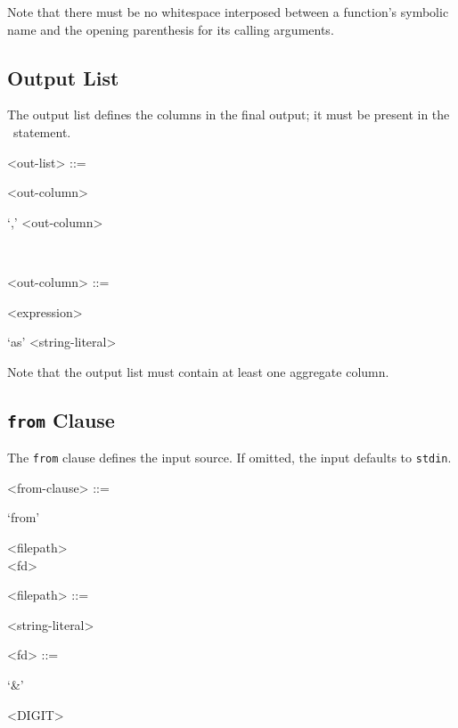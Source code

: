 Note that there must be no whitespace interposed between a function's
symbolic name and the opening parenthesis for its calling arguments.

\subsection{Output List}

The output list defines the columns in the final output; it must be
present in the \stag\ statement.

\begin{grammar}
  <out-list> ::= \begin{syntdiag}
    <out-column>
    \begin{stack}
      \begin{rep}`,' <out-column>\end{rep} \\
    \end{stack}
  \end{syntdiag}

  <out-column> ::= \begin{syntdiag}
    <expression>
    \begin{stack}
      `as' <string-literal> \\
    \end{stack}
  \end{syntdiag}
\end{grammar}

Note that the output list must contain at least one aggregate column.

\subsection{\texttt{from} Clause}

The \texttt{from} clause defines the input source. If omitted, the input
defaults to \texttt{stdin}.

\begin{grammar}
  <from-clause> ::= \begin{syntdiag}
    `from'
    \begin{stack}
      <filepath> \\
      <fd>
    \end{stack}
  \end{syntdiag}

  <filepath> ::= \begin{syntdiag}
    <string-literal>
  \end{syntdiag}

  <fd> ::= \begin{syntdiag}
    `\&'
    \begin{rep}
      <DIGIT>
    \end{rep}
  \end{syntdiag}
\end{grammar}

